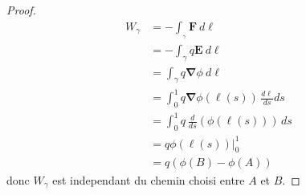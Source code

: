 \begin{enumerate}
\begin{proof}
\begin{align*}
W_{\gamma} & =-\int _{_{\gamma}}\boldsymbol{F}~d\boldsymbol{\ell} \\
 & =-\int _{\gamma}q\boldsymbol{E}~d\boldsymbol{\ell} \\
 & =\int _{\gamma}q\boldsymbol{\nabla}\phi~d\boldsymbol{\ell} \\
 & =\int_{0}^{1} q\boldsymbol{\nabla}\phi(\boldsymbol{\ell}(s)) \, \frac{d\boldsymbol{\ell}}{ds}ds \\
 &  =\int_{0}^{1} q~ \frac{d}{ds}(\phi(\boldsymbol{\ell}(s))) \, ds \\
 & = q\phi(\boldsymbol{\ell}(s))|_{0}^{1} \\
 & =q(\phi(B)-\phi(A))
\end{align*}
donc $W_{\gamma}$ est independant du chemin choisi entre $A$ et $B$.


\end{proof}
\end{enumerate}
